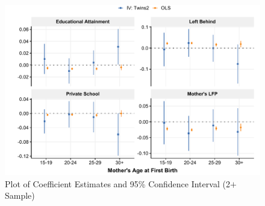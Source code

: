 \documentclass[11pt,a4paper]{article}
\begin{document}
\begin{figure}[h!]
\centering
\caption{\label{fig:04}Plot of Coefficient Estimates and 95\% Confidence Interval (2$ + $ Sample)}
\includegraphics[width=\textwidth]{figures/age_mods.pdf}
\end{figure}





\end{document}
